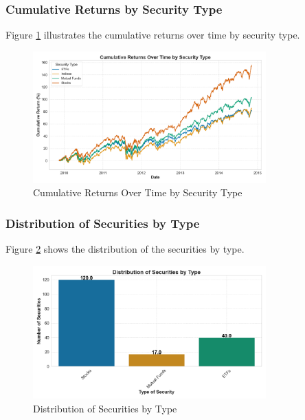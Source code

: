 \subsubsection{Cumulative Returns by Security Type}
Figure \ref{fig:cumulative_returns_by_type} illustrates the cumulative returns over time by security type.

\begin{figure}[!htbp]
    \centering
    \includegraphics[width=0.8\textwidth]{../Figures/cumulative_returns_by_type.png}
    \caption{Cumulative Returns Over Time by Security Type}
    \label{fig:cumulative_returns_by_type}
\end{figure}

\subsubsection{Distribution of Securities by Type}
Figure \ref{fig:distribution_of_securities} shows the distribution of the securities by type.

\begin{figure}[!htbp]
    \centering
    \includegraphics[width=0.8\textwidth]{../Figures/histogram_security_count.png}
    \caption{Distribution of Securities by Type}
    \label{fig:distribution_of_securities}
\end{figure}

\newpage
